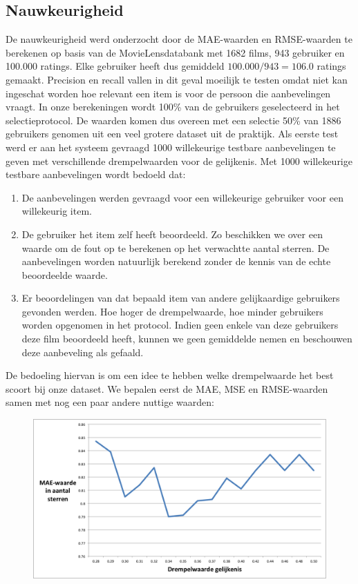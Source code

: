 \subsection{Nauwkeurigheid}
De nauwkeurigheid werd onderzocht door de MAE-waarden en RMSE-waarden te berekenen op basis van de MovieLensdatabank met 1682 films, 943 gebruiker en 100.000 ratings. Elke gebruiker heeft dus gemiddeld $100.000/943 =106.0$ ratings gemaakt. Precision en recall vallen in dit geval moeilijk te testen omdat niet kan ingeschat worden hoe relevant een item is voor de persoon die aanbevelingen vraagt. In onze berekeningen wordt 100\% van de gebruikers geselecteerd in het selectieprotocol. De waarden komen dus overeen met een selectie 50\% van 1886 gebruikers genomen uit een veel grotere dataset uit de praktijk. Als eerste test werd er aan het systeem gevraagd 1000 willekeurige testbare aanbevelingen te geven met verschillende drempelwaarden voor de gelijkenis. Met 1000 willekeurige testbare aanbevelingen wordt bedoeld dat: 
\begin{enumerate}
\item De aanbevelingen werden gevraagd voor een willekeurige gebruiker voor een willekeurig item.
\item De gebruiker het item zelf heeft beoordeeld. Zo beschikken we over een waarde om de fout op te berekenen op het verwachtte aantal sterren. De aanbevelingen worden natuurlijk berekend zonder de kennis van de echte beoordeelde waarde.
\item Er beoordelingen van dat bepaald item van andere gelijkaardige gebruikers gevonden werden. Hoe hoger de drempelwaarde, hoe minder gebruikers worden opgenomen in het protocol. Indien geen enkele van deze gebruikers deze film beoordeeld heeft, kunnen we geen gemiddelde nemen en beschouwen deze aanbeveling als gefaald.
\end{enumerate}

\pagebreak
De bedoeling hiervan is om een idee te hebben welke drempelwaarde het best scoort bij onze dataset. We bepalen eerst de MAE, MSE en RMSE-waarden samen met nog een paar andere nuttige waarden:


\begin{figure}[htpb]   
    \label{Figuur::mae}      
  \begin{center}    
 \includegraphics[width=\textwidth]{fig/mae}    
  \end{center}   
\end{figure}
   
